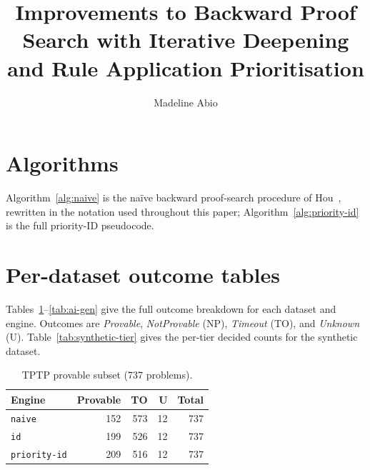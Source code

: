 \documentclass[runningheads]{llncs}
\begin{document}
\title{Improvements to Backward Proof Search with Iterative
Deepening and Rule Application Prioritisation}

\author{Madeline Abio}

\maketitle
\begin{abstract}
  
\end{abstract}








\FloatBarrier



\appendix

\section{Algorithms}\label{app:algorithms}

Algorithm~\ref{alg:naive} is the na\"ive backward proof-search procedure
of Hou~\cite[Algorithm~2, p.~67]{hou2021fundamentals}, rewritten in the
notation used throughout this paper; Algorithm~\ref{alg:priority-id} is
the full priority-ID pseudocode.





\section{Per-dataset outcome tables}\label{app:tables}

Tables~\ref{tab:tptp-provable}--\ref{tab:ai-gen} give the full outcome
breakdown for each dataset and engine. Outcomes are \textit{Provable},
\textit{NotProvable} (NP), \textit{Timeout} (TO), and
\textit{Unknown} (U). Table~\ref{tab:synthetic-tier} gives the per-tier
decided counts for the synthetic dataset.

\begin{table}[h]
  \centering
  \caption{TPTP provable subset (737 problems).}
  \label{tab:tptp-provable}
  \begin{tabular}{lrrrr}
    \toprule
    Engine & Provable & TO & U & Total \\
    \midrule
    \texttt{naive}       & 152 & 573 & 12 & 737 \\
    \texttt{id}          & 199 & 526 & 12 & 737 \\
    \texttt{priority-id} & 209 & 516 & 12 & 737 \\
    \bottomrule
  \end{tabular}
\end{table}
\end{document}
